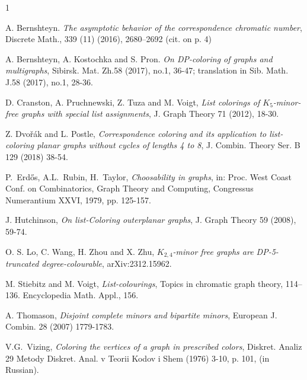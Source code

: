 \documentclass[11pt,a4paper]{article}
\theoremstyle{definition}
\begin{document}
		\begin{thebibliography}{1}

 A. Bernshteyn. \emph{The asymptotic behavior of the correspondence chromatic number}, Discrete
Math., 339 (11) (2016), 2680–2692 (cit. on p. 4)
 
	A. Bernshteyn, A. Kostochka and S. Pron.	\emph{On DP-coloring of graphs and multigraphs}, Sibirsk. Mat. Zh.58 (2017), no.1, 36-47; translation in Sib. Math. J.58 (2017), no.1, 28-36.




  D. Cranston, A. Pruchnewski, Z. Tuza and M. Voigt,
 {\em  List colorings of
 	$K_5$-minor-free graphs with
 	special list assignments}, J. Graph Theory 71 (2012), 18-30.
 




			 Z. Dvo\v{r}\'{a}k and L. Postle, \emph{Correspondence coloring and its application to list-coloring planar graphs without cycles of lengths 4 to 8}, J. Combin. Theory Ser. B 129 (2018) 38-54.
			
		 	 P.~Erd\H{o}s, A.L.~Rubin, H.~Taylor, \emph{Choosability in graphs}, in: Proc. West Coast Conf. on Combinatorics, Graph Theory and Computing, Congressus Numerantium XXVI, 1979, pp. 125-157.

  J. Hutchinson, {\em On list-Coloring
 	outerplanar graphs}, J. Graph Theory 59 (2008), 59-74.
			
			
    O. S. Lo, C. Wang, H. Zhou and X. Zhu, {\em $K_{2,4}$-minor free graphs are DP-5-truncated degree-colourable},  arXiv:2312.15962.

  
   M. Stiebitz and M.   Voigt,  {\em 
List-colourings},  Topics in chromatic graph theory, 114–136.
Encyclopedia Math. Appl., 156.

  A. Thomason, {\em Disjoint complete minors and bipartite minors}, European J. Combin. 28 (2007) 1779-1783.
 
  
	
	 V.G.~Vizing, \emph{Coloring the vertices of a graph in prescribed colors}, Diskret. Analiz 29 Metody Diskret. Anal. v Teorii Kodov i Shem (1976) 3-10, p. 101, (in Russian).

		\end{thebibliography}
		
		
		
	
\end{document}
